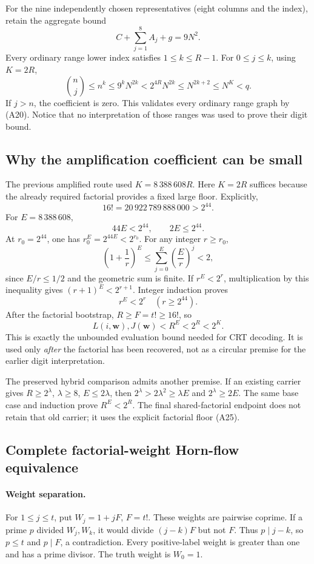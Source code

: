 For the nine independently chosen representatives (eight columns and
the index), retain the aggregate bound
\[
 C+\sum_{j=1}^{8}A_j+g=9N^2.                            \tag{A23}
\]
Every ordinary range lower index satisfies \(1\le k\le R-1\).
For \(0\le j\le k\), using \(K=2R\),
\[
 \binom nj\le n^k\le9^kN^{2k}
 <2^{4R}N^{2k}\le N^{2k+2}\le N^K<q.                   \tag{A24}
\]
If \(j>n\), the coefficient is zero.  This validates every ordinary
range graph by (A20).  Notice that no interpretation of those ranges
was used to prove their digit bound.

\subsection{Why the amplification coefficient can be small}

The previous amplified route used \(K=8\,388\,608R\).
Here \(K=2R\) suffices because the already required factorial provides
a fixed large floor.  Explicitly,
\[
 16!=20\,922\,789\,888\,000>2^{44}.
\]
For \(E=8\,388\,608\),
\[
 44E<2^{44},\qquad 2E\le2^{44}.                         \tag{A25}
\]
At \(r_0=2^{44}\), one has \(r_0^E=2^{44E}<2^{r_0}\).
For any integer \(r\ge r_0\),
\[
 \left(1+\frac1r\right)^E
 \le\sum_{j=0}^{E}\left(\frac Er\right)^j<2,
\]
since \(E/r\le1/2\) and the geometric sum is finite.
If \(r^E<2^r\), multiplication by this inequality gives
\((r+1)^E<2^{r+1}\).  Integer induction proves
\[
 r^E<2^r\quad(r\ge2^{44}).
\]
After the factorial bootstrap, \(R\ge F=t!\ge16!\), so
\[
 L(i,\mathbf w),J(\mathbf w)<R^E<2^R<2^K.               \tag{A26}
\]
This is exactly the unbounded evaluation bound needed for CRT decoding.
It is used only \emph{after} the factorial has been recovered, not as a
circular premise for the earlier digit interpretation.

The preserved hybrid comparison admits another premise.
If an existing carrier gives
\(R\ge2^\lambda\), \(\lambda\ge8\), \(E\le2\lambda\), then
\(2^\lambda>2\lambda^2\ge\lambda E\) and \(2^\lambda\ge2E\).
The same base case and induction prove \(R^E<2^R\).
The final shared-factorial endpoint does not retain that old carrier;
it uses the explicit factorial floor (A25).

\subsection{Complete factorial-weight Horn-flow equivalence}

\paragraph{Weight separation.}
For \(1\le j\le t\), put \(W_j=1+jF\), \(F=t!\).
These weights are pairwise coprime.  If a prime \(p\) divided
\(W_j,W_k\), it would divide \((j-k)F\) but not \(F\).
Thus \(p\mid j-k\), so \(p\le t\) and \(p\mid F\), a contradiction.
Every positive-label weight is greater than one and has a prime divisor.
The truth weight is \(W_0=1\).

